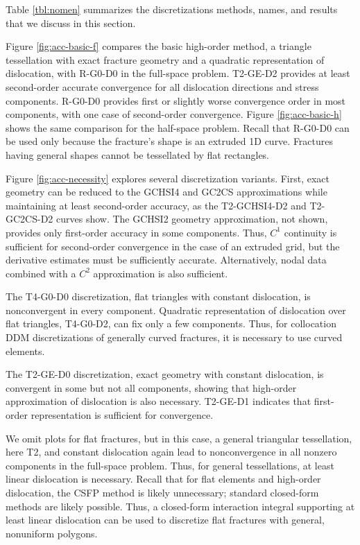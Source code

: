 \documentclass[11pt]{article}
\begin{document}
Table \ref{tbl:nomen} summarizes the discretizations methods, names, and results
that we discuss in this section.

Figure \ref{fig:acc-basic-f} compares the basic high-order method,
a triangle tessellation with exact fracture geometry
and a quadratic representation of dislocation,
with R-G0-D0 in the full-space problem.
T2-GE-D2 provides at least second-order accurate convergence
for all dislocation directions and stress components.
R-G0-D0 provides first or slightly worse convergence order
in most components, with one case of second-order convergence.
Figure \ref{fig:acc-basic-h} shows the same comparison for the half-space problem.
Recall that R-G0-D0 can be used only because the fracture's
shape is an extruded 1D curve.
Fractures having general shapes cannot be tessellated by flat rectangles.

Figure \ref{fig:acc-necessity} explores
several discretization variants.
First, exact geometry can be reduced to the GCHSI4 and GC2CS approximations
while maintaining at least second-order accuracy,
as the T2-GCHSI4-D2 and T2-GC2CS-D2 curves show.
The GCHSI2 geometry approximation, not shown,
provides only first-order accuracy in some components.
Thus, $C^1$ continuity is sufficient for second-order convergence in the case of an extruded grid,
but the derivative estimates must be sufficiently accurate.
Alternatively, nodal data combined with a $C^2$ approximation is also sufficient.

The T4-G0-D0 discretization, flat triangles with constant dislocation,
is nonconvergent in every component.
Quadratic representation of dislocation over flat triangles, T4-G0-D2, can fix only a few components.
Thus, for collocation DDM discretizations of generally curved fractures,
it is necessary to use curved elements.

The T2-GE-D0 discretization, exact geometry with constant dislocation,
is convergent in some but not all components,
showing that high-order approximation of dislocation is also necessary.
T2-GE-D1 indicates that first-order representation is sufficient for convergence.

We omit plots for flat fractures, but in this case,
a general triangular tessellation, here T2, and constant dislocation again lead to
nonconvergence in all nonzero components in the full-space problem.
Thus, for general tessellations, at least linear dislocation is necessary.
Recall that for flat elements and high-order dislocation,
the CSFP method is likely unnecessary;
standard closed-form methods are likely possible.
Thus, a closed-form interaction integral supporting at least linear dislocation
can be used to discretize flat fractures with general, nonuniform polygons.
\end{document}
